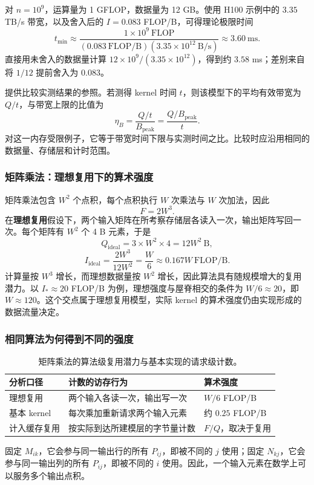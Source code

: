 对 $n=10^9$，运算量为 1 GFLOP，数据量为 12 GB。使用 H100 示例中的 $3.35$ TB/s 带宽，以及舍入后的 $I=0.083$ FLOP/B，可得理论极限时间
\begin{equation}
 t_{\min}\approx
 \frac{1\times10^9\ \mathrm{FLOP}}
 {(0.083\ \mathrm{FLOP/B})(3.35\times10^{12}\ \mathrm{B/s})}
 \approx3.60\ \mathrm{ms}.
\label{l5:eq:vec-time}
\end{equation}
直接用未舍入的数据量计算 $12\times10^9/(3.35\times10^{12})$，得到约 $3.58$ ms；差别来自将 $1/12$ 提前舍入为 $0.083$。

提供比较实测结果的参照。若测得 kernel 时间 $t$，则该模型下的平均有效带宽为 $Q/t$，与带宽上限的比值为
\[
\eta_B=\frac{Q/t}{B_{\mathrm{peak}}}
      =\frac{Q/B_{\mathrm{peak}}}{t}.
\]
对这一内存受限例子，它等于带宽时间下限与实测时间之比。比较时应沿用相同的数据量、存储层和计时范围。

\subsubsection{矩阵乘法：理想复用下的算术强度}
矩阵乘法包含 $W^2$ 个点积，每个点积执行 $W$ 次乘法与 $W$ 次加法，因此
\[
F=2W^3.
\]
在\textbf{理想复用}假设下，两个输入矩阵在所考察存储层各读入一次，输出矩阵写回一次。每个矩阵有 $W^2$ 个 4 B 元素，于是
\[
Q_{\mathrm{ideal}}
=3\times W^2\times4
=12W^2\ \mathrm{B},
\]
\begin{equation}
I_{\mathrm{ideal}}
=\frac{2W^3}{12W^2}
=\frac W6
\approx0.167W\ \mathrm{FLOP/B}.
\label{l5:eq:ideal-ai}
\end{equation}
计算量按 $W^3$ 增长，而理想数据量按 $W^2$ 增长，因此算法具有随规模增大的复用潜力。以 $I_*\approx20$ FLOP/B 为例，理想强度与屋脊相交的条件为 $W/6\approx20$，即 $W\approx120$。这个交点属于理想复用模型，实际 kernel 的算术强度仍由实现形成的数据流量决定。

\subsubsection{相同算法为何得到不同的强度}
\begin{table}[H]
\centering\small
\caption{矩阵乘法的算法级复用潜力与基本实现的请求级计数。}
\begin{tabularx}{\textwidth}{L{0.22\textwidth} Y Y}
\toprule
分析口径 & 计数的访存行为 & 算术强度 \\
\midrule
理想复用 & 两个输入各读一次，输出写一次 & $W/6$ FLOP/B \\
基本 kernel & 每次乘加重新请求两个输入元素 & 约 $0.25$ FLOP/B \\
计入缓存复用 & 按实际到达所建模层的字节量计数 & $F/Q$，取决于复用 \\
\bottomrule
\end{tabularx}
\end{table}
固定 $M_{ik}$，它会参与同一输出行的所有 $P_{ij}$，即被不同的 $j$ 使用；固定 $N_{kj}$，它会参与同一输出列的所有 $P_{ij}$，即被不同的 $i$ 使用。因此，一个输入元素在数学上可以服务多个输出点积。

